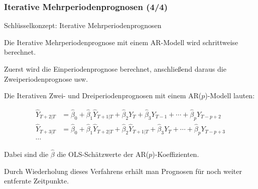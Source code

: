 \documentclass[10pt,aspectratio=169]{beamer}\usepackage[]{graphicx}\usepackage[]{xcolor}
\begin{document}
\begin{frame}
  \frametitle{Iterative Mehrperiodenprognosen \hfill (4/4)}


  \begin{alertblock}{Schlüsselkonzept: Iterative Mehrperiodenprognosen}

  Die Iterative Mehrperiodenprognose mit einem AR-Modell wird schrittweise berechnet.
  
  Zuerst wird die Einperiodenprognose berechnet, anschließend daraus die Zweiperiodenprognose usw.
  
  Die Iterativen Zwei- und Dreiperiodenprognosen mit einem AR($p$)-Modell lauten:
  
  \vspace{-0.25cm}
  
  \begin{align*}
  \hat{Y}_{T+2|T} &= \hat{\beta}_0 + \hat{\beta}_1 \hat{Y}_{T+1|T} + \hat{\beta}_2 Y_T + \hat{\beta}_3 Y_{T-1} + \cdots + \hat{\beta}_p Y_{T-p+2} \\
  \hat{Y}_{T+3|T} &= \hat{\beta}_0 + \hat{\beta}_1 \hat{Y}_{T+2|T} + \hat{\beta}_2 \hat{Y}_{T+1|T} + \hat{\beta}_3 Y_T + \cdots + \hat{\beta}_p Y_{T-p+3} \\
  \cdots
  \end{align*}
  
  \vspace{-0.25cm}
  
  Dabei sind die $\hat{\beta}$ die OLS-Schätzwerte der AR($p$)-Koeffizienten.
  
  Durch Wiederholung dieses Verfahrens erhält man Prognosen für noch weiter entfernte Zeitpunkte.
  

	\end{alertblock}
  
\end{frame}
\end{document}
